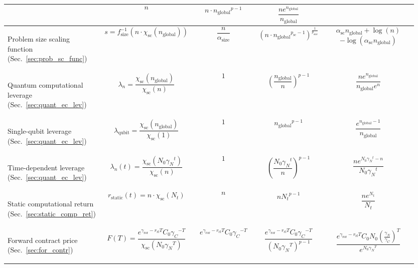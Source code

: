 \begin{table}[!htbp]
{\begin{tabular}{|m{0.21\linewidth}|m{0.21\linewidth}|m{0.15\linewidth}|m{0.155\linewidth}|m{0.225\linewidth}|}
\[\] & \[n\] & \[n\cdot{n_\mathrm{global}}^{p-1}\] & \[\frac{n e^{n_\mathrm{global}}}{n_\mathrm{global}}\]\\
	\hline
	\begin{flushleft}Problem size scaling function (Sec.~\ref{sec:prob_sc_func})\end{flushleft} & \[s = f_\mathrm{size}^{-1}(n\cdot \chi_\mathrm{sc}(n_\mathrm{global}))\] & \[\frac{n}{\alpha_\mathrm{size}}\] & \[(n \cdot {n_\mathrm{global}}^{p_\mathrm{sc}-1})^\frac{1}{p_\mathrm{size}}\] & \[\alpha_\mathrm{sc}n_\mathrm{global} + \log(n)\]\[-\log(\alpha_\mathrm{sc}n_\mathrm{global})\] \\
	\hline
	\begin{flushleft}Quantum computational leverage (Sec.~\ref{sec:quant_ec_lev})\end{flushleft} & \[\lambda_n=\frac{\chi_\mathrm{sc}(n_\mathrm{global})}{\chi_\mathrm{sc}(n)}\] & \[1\] & \[\left(\frac{n_\mathrm{global}}{n}\right)^{p-1}\] & \[\frac{n e^{n_\mathrm{global}}}{n_\mathrm{global}e^n}\]\\
	\hline
	\begin{flushleft}Single-qubit leverage (Sec.~\ref{sec:quant_ec_lev})\end{flushleft} & \[\lambda_\mathrm{qubit}=\frac{\chi_\mathrm{sc}(n_\mathrm{global})}{\chi_\mathrm{sc}(1)}\] & \[1\] & \[{n_\mathrm{global}}^{p-1}\] & \[\frac{e^{n_\mathrm{global}-1}}{n_\mathrm{global}}\]\\
	\hline
	\begin{flushleft}Time-dependent leverage (Sec.~\ref{sec:quant_ec_lev})\end{flushleft} & \[\lambda_n(t)=\frac{\chi_\mathrm{sc}(N_0{\gamma_N}^t)}{\chi_\mathrm{sc}(n)}\] &  \[1\] & \[\left(\frac{N_0{\gamma_N}^t}{n}\right)^{p-1}\] & \[\frac{n e^{N_0{\gamma_N}^t-n}}{N_0{\gamma_N}^t}\]\\
	\hline
	\begin{flushleft}Static computational return (Sec.~\ref{sec:static_comp_ret})\end{flushleft} & \[r_\mathrm{static}(t) = n\cdot\chi_\mathrm{sc}(N_t)\] & \[n\] & \[n{N_t}^{p-1}\] & \[\frac{n e^{N_t}}{N_t}\] \\
	\hline
	\begin{flushleft}Forward contract price (Sec.~\ref{sec:for_contr})\end{flushleft} & \[F(T)=\frac{e^{\gamma_\mathrm{ror}-r_\mathrm{rf}T} C_0{\gamma_C}^{-T}}{\chi_\mathrm{sc}(N_0 {\gamma_N}^T)}\]
 & \[e^{\gamma_\mathrm{ror}-r_\mathrm{rf}T} C_0{\gamma_C}^{-T}\] & \[\frac{e^{\gamma_\mathrm{ror}-r_\mathrm{rf}T} C_0{\gamma_C}^{-T}}{(N_0 {\gamma_N}^T)^{p-1}}\] & \[\frac{e^{\gamma_\mathrm{ror}-r_\mathrm{rf}T} C_0N_0\left(\frac{\gamma_N}{\gamma_C}\right)^T}{e^{N_0 {\gamma_N}^T}}\] \\

\end{tabular}}
\end{table}
